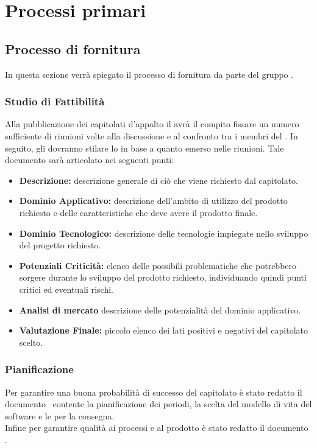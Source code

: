 \section{Processi primari}
\subsection{Processo di fornitura}
In questa sezione verrà spiegato il processo di fornitura da parte del gruppo \gruppo.

\subsubsection{Studio di Fattibilità}
Alla pubblicazione dei capitolati d'appalto il \textit{\Pm} avrà il compito fissare un
numero sufficiente di riunioni volte alla discussione e al confronto tra i membri del .
In seguito, gli \textit{\AnP} dovranno stilare lo \textit{\SdF} in base a quanto
emerso nelle riunioni. Tale documento sarà articolato nei seguenti punti:
\begin{itemize}
	\item \textbf{Descrizione:} descrizione generale di ciò che viene richiesto
	dal capitolato.
	\item \textbf{Dominio Applicativo:} descrizione dell'ambito di utilizzo del
	prodotto richiesto e delle caratteristiche che deve avere il prodotto finale.
	\item \textbf{Dominio Tecnologico:} descrizione delle tecnologie impiegate
	nello sviluppo del progetto richiesto.
	\item \textbf{Potenziali Criticità:} elenco delle possibili problematiche che potrebbero
	sorgere durante lo sviluppo del prodotto richiesto, individuando quindi punti
	critici ed eventuali rischi.
	\item \textbf{Analisi di mercato} descrizione delle potenzialità del dominio applicativo.
	\item \textbf{Valutazione Finale:} piccolo elenco dei lati positivi e negativi del capitolato scelto.
\end{itemize}

\subsubsection{Pianificazione}
Per garantire una buona probabilità di successo del capitolato è stato redatto il documento \PdP\ contente la pianificazione dei periodi, la scelta del modello di vita del software e le  per la consegna. \\
Infine per garantire qualità ai processi e al prodotto è stato redatto il documento \PdQ.

